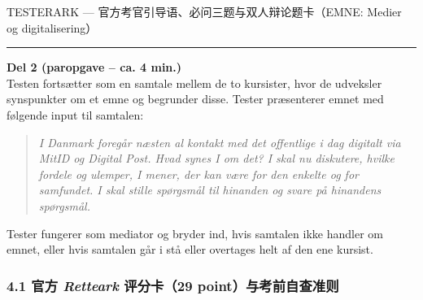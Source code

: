 \begin{emailbox}{TESTERARK --- 官方考官引导语、必问三题与双人辩论题卡（EMNE: Medier og digitalisering）}
\vspace{0.35em}
\hrule
\vspace{0.35em}
\textbf{\color{NCDRed}Del 2 (paropgave -- ca. 4 min.)}\\
Testen fortsætter som en samtale mellem de to kursister, hvor de udveksler synspunkter om et emne og begrunder disse. Tester præsenterer emnet med følgende input til samtalen:
\begin{quote}
\textit{I Danmark foregår næsten al kontakt med det offentlige i dag digitalt via MitID og Digital Post. Hvad synes I om det? I skal nu diskutere, hvilke fordele og ulemper, I mener, der kan være for den enkelte og for samfundet. I skal stille spørgsmål til hinanden og svare på hinandens spørgsmål.}
\end{quote}
\small\textcolor{NCDGray}{Tester fungerer som mediator og bryder ind, hvis samtalen ikke handler om emnet, eller hvis samtalen går i stå eller overtages helt af den ene kursist.}
\end{emailbox}

\clearpage
{}

\subsubsection*{4.1 官方 \textit{Retteark} 评分卡（29 point）与考前自查准则}

